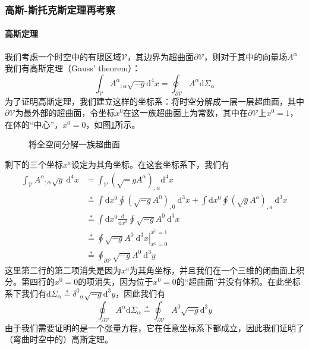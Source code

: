 \documentclass[hyperref, UTF8, a4paper]{ctexart}
\begin{document}
\subsubsection{高斯-斯托克斯定理再考察}
\paragraph{高斯定理}

我们考虑一个时空中的有限区域$\mathscr{V}$，其边界为超曲面$\partial \mathscr{V}$，则对于其中的向量场$A^{\alpha }$我们有高斯定理（Gauss' theorem）：
\begin{equation*}
	\int _{\mathscr{V}} A^{\alpha }{}_{;\alpha }\sqrt{-g}\mathrm{d}^{4} x=\oint _{\partial \mathscr{V}} A^{\alpha }\mathrm{d} \Sigma _{\alpha }
\end{equation*}
为了证明高斯定理，我们建立这样的坐标系：将时空分解成一层一层超曲面，其中$\partial \mathscr{V}$为最外部的超曲面，令坐标$x^{0}$在这一族超曲面上为常数，其中在$\partial \mathscr{V}$上$x^{0} =1$，在体的“中心”，$x^{0} =0$，如图\ref{fig:foilation_of_gauss_theorem}所示。

\begin{figure}
	\centering
	
	\caption{将全空间分解一族超曲面}
	\label{fig:foilation_of_gauss_theorem}
\end{figure}

剩下的三个坐标$x^{a}$设定为其角坐标。在这套坐标系下，我们有
\begin{equation*}
	\begin{aligned}
		\int _{\mathscr{V}} A^{\alpha }{}_{;\alpha }\sqrt{g} \ \mathrm{d}^{4} x & =\int _{\mathscr{V}}\left(\sqrt{-} gA^{\alpha }\right)_{,\alpha }\mathrm{d}^{4} x\\
		& \stackrel{*}{=}\int \mathrm{d} x^{0}\oint \left(\sqrt{-g} A^{0}\right)_{,0} \ \mathrm{d}^{3} x+\int \mathrm{d} x^{0}\oint \left(\sqrt{g} A^{a}\right)_{,a} \ \mathrm{d}^{3} x\\
		& \stackrel{*}{=}\int \mathrm{d} x^{0}\frac{\mathrm{d}}{\mathrm{d} x^{0}}\oint \sqrt{-g} A^{0} \ \mathrm{d}^{3} x\\
		& \stackrel{*}{=}\left. \oint \sqrt{-g} A^{0} \ \mathrm{d}^{3} x\right| _{x^{0} =0}^{x^{0} =1}\\
		& \stackrel{*}{=}\oint _{\partial \mathscr{V}}\sqrt{-g} A^{0} \ \mathrm{d}^{3} y
	\end{aligned}
\end{equation*}
这里第二行的第二项消失是因为$x^{a}$为其角坐标，并且我们在一个三维的闭曲面上积分。第四行的$x^{0} =0$的项消失，因为位于$x^{0} =0$的“超曲面”并没有体积。在此坐标系下我们有$\mathrm{d} \Sigma _{\alpha }\stackrel{*}{=} \delta ^{0}{}_{\alpha }\sqrt{-g}\mathrm{d}^{3} y$，因此我们有
\begin{equation*}
	\oint _{\partial \mathscr{V}} A^{\alpha }\mathrm{d} \Sigma _{\alpha }\stackrel{*}{=}\oint _{\partial \mathscr{V}} A^{0}\sqrt{-g}\mathrm{d}^{3} y
\end{equation*}
由于我们需要证明的是一个张量方程，它在任意坐标系下都成立，因此我们证明了（弯曲时空中的）高斯定理。
\end{document}
